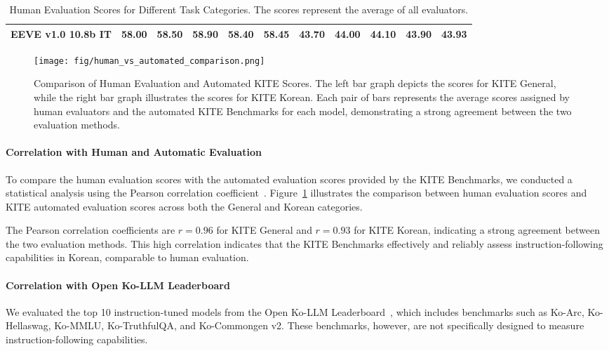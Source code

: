 \begin{table*}[t]
{\begin{tabular}{ccccccccccc}
            EEVE v1.0 10.8b IT                                   & 58.00            & 58.50            & 58.90            & 58.40            & 58.45                             & 43.70            & 44.00            & 44.10            & 43.90            & 43.93         \\ \hline
            \end{tabular}
        }
        \caption{Human Evaluation Scores for Different Task Categories. The scores represent the average of all evaluators.}
        \label{tab:human_evaluation}
    \end{table*}

    \begin{figure}[t]
        \centering
        \texttt{[image: fig/human\_vs\_automated\_comparison.png]}
        \caption{Comparison of Human Evaluation and Automated KITE Scores. The left bar graph depicts the scores for KITE General, while the right bar graph illustrates the scores for KITE Korean. Each pair of bars represents the average scores assigned by human evaluators and the automated KITE Benchmarks for each model, demonstrating a strong agreement between the two evaluation methods.}
        \label{fig:human_vs_automated}
    \end{figure}

    \paragraph{Correlation with Human and Automatic Evaluation}
    To compare the human evaluation scores with the automated evaluation scores provided by the KITE Benchmarks, we conducted a statistical analysis using the Pearson correlation coefficient~\cite{benesty2009pearson}. Figure~\ref{fig:human_vs_automated} illustrates the comparison between human evaluation scores and KITE automated evaluation scores across both the General and Korean categories.

    The Pearson correlation coefficients are \( r = 0.96 \) for KITE General and \( r = 0.93 \) for KITE Korean, indicating a strong agreement between the two evaluation methods. This high correlation indicates that the KITE Benchmarks effectively and reliably assess instruction-following capabilities in Korean, comparable to human evaluation.

    \paragraph{Correlation with Open Ko-LLM Leaderboard}
    We evaluated the top 10 instruction-tuned models from the Open Ko-LLM Leaderboard~\cite{park2024open}, which includes benchmarks such as Ko-Arc, Ko-Hellaswag, Ko-MMLU, Ko-TruthfulQA, and Ko-Commongen v2. These benchmarks, however, are not specifically designed to measure instruction-following capabilities.

